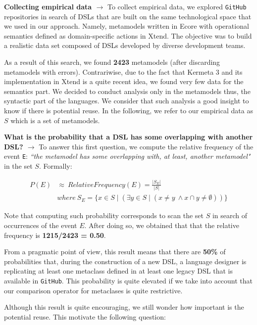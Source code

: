 \textbf{Collecting empirical data $\rightarrow$} To collect empirical data, we explored \texttt{GitHub} repositories in search of DSLs that are built on the same technological space that we used in our approach. Namely, metamodels written in Ecore with operational semantics defined as domain-specific actions in Xtend. The objective was to build a realistic data set composed of DSLs developed by diverse development teams. 

As a result of this search, we found \textbf{2423} metamodels (after discarding metamodels with errors). Contrariwise, due to the fact that Kermeta 3 and its implementation in Xtend is a quite recent idea, we found very few data for the semantics part. We decided to conduct analysis only in the metamodels thus, the syntactic part of the languages. We consider that such analysis a good insight to know if there is potential reuse.  In the following, we refer to our empirical data as $S$ which is a set of metamodels.

\textbf{What is the probability that a DSL has some overlapping with another DSL? $\rightarrow$} To answer this first question, we compute the relative frequency of the event \texttt{E}: \textit{``the metamodel has some overlapping with, at least, another metamodel"} in the set $S$. Formally:

\begin{equation}
\begin{split}
P(E) & \approx ~ Relative Frequency (E) = \frac{|S_{E}|}{|S|}\\
& where ~ S_{E} = \{x \in S \mid (\exists y \in S \mid (x \neq y ~ \wedge x \cap y \neq \emptyset )) \}
\end{split}
\end{equation}

Note that computing such probability corresponds to scan the set $S$ in search of occurrences of the event $E$. After doing so, we obtained that that the relative frequency is \textbf{1215/2423 = 0.50}.

From a pragmatic point of view, this result means that there are \textbf{50\%} of probabilities that, during the construction of a new DSL, a language designer is replicating at least one metaclass defined in at least one legacy DSL that is available in \texttt{GitHub}. This probability is quite elevated if we take into account that our comparison operator for metaclases is quite restrictive.

Although this result is quite encouraging, we still wonder how important is the potential reuse. This motivate the following question:

